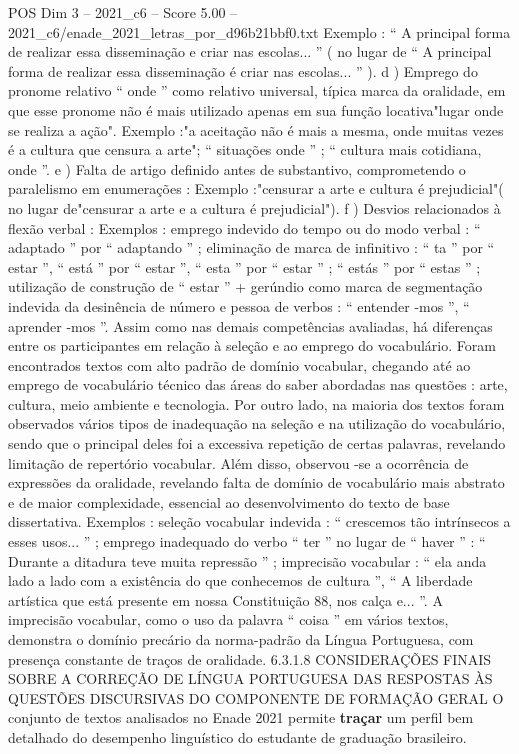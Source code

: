 \begin{textsample}{POS Dim 3 – 2021\_c6 – Score 5.00 – 2021\_c6/enade\_2021\_letras\_por\_d96b21bbf0.txt}
Exemplo : “ A principal forma de realizar essa disseminação e criar nas escolas... ” ( no lugar de “ A principal forma de realizar essa disseminação é criar nas escolas... ” ). d ) Emprego do pronome relativo “ onde ” como relativo universal, típica marca da oralidade, em que esse pronome não é mais utilizado apenas em sua função locativa"lugar onde se realiza a ação".
Exemplo :"a aceitação não é mais a mesma, onde muitas vezes é a cultura que censura a arte"; “ situações onde ” ; “ cultura mais cotidiana, onde ”. e ) Falta de artigo definido antes de substantivo, comprometendo o paralelismo em enumerações : Exemplo :"censurar a arte e cultura é prejudicial"( no lugar de"censurar a arte e a cultura é prejudicial"). f ) Desvios relacionados à flexão verbal : Exemplos : emprego indevido do tempo ou do modo verbal : “ adaptado ” por “ adaptando ” ; eliminação de marca de infinitivo : “ ta ” por “ estar ”, “ está ” por “ estar ”, “ esta ” por “ estar ” ; “ estás ” por “ estas ” ; utilização de construção de “ estar ” + gerúndio como marca de segmentação indevida da desinência de número e pessoa de verbos : “ entender -mos ”, “ aprender -mos ”.
Assim como nas demais competências avaliadas, há diferenças entre os participantes em relação à seleção e ao emprego do vocabulário.
Foram encontrados textos com alto padrão de domínio vocabular, chegando até ao emprego de vocabulário técnico das áreas do saber abordadas nas questões : arte, cultura, meio ambiente e tecnologia.
Por outro lado, na maioria dos textos foram observados vários tipos de inadequação na seleção e na utilização do vocabulário, sendo que o principal deles foi a excessiva repetição de certas palavras, revelando limitação de repertório vocabular.
Além disso, observou -se a ocorrência de expressões da oralidade, revelando falta de domínio de vocabulário mais abstrato e de maior complexidade, essencial ao desenvolvimento do texto de base dissertativa.
Exemplos : seleção vocabular indevida : “ crescemos tão intrínsecos a esses usos... ” ; emprego inadequado do verbo “ ter ” no lugar de “ haver ” : “ Durante a ditadura teve muita repressão ” ; imprecisão vocabular : “ ela anda lado a lado com a existência do que conhecemos de cultura ”, “ A liberdade artística que está presente em nossa Constituição 88, nos calça e... ”.
A imprecisão vocabular, como o uso da palavra “ coisa ” em vários textos, demonstra o domínio precário da norma-padrão da Língua Portuguesa, com presença constante de traços de oralidade. 6.3.1.8 CONSIDERAÇÕES FINAIS SOBRE A CORREÇÃO DE LÍNGUA PORTUGUESA DAS RESPOSTAS ÀS QUESTÕES DISCURSIVAS DO COMPONENTE DE FORMAÇÃO GERAL O conjunto de textos analisados no Enade 2021 permite \textbf{traçar} um perfil bem detalhado do desempenho linguístico do estudante de graduação brasileiro.

\end{textsample}
